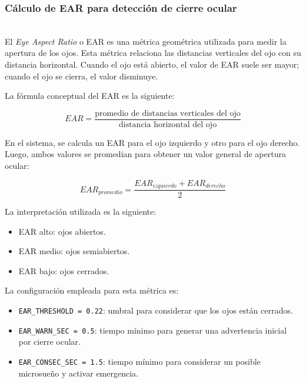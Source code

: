 \documentclass[conference]{IEEEtran}
\begin{document}
\subsubsection{Cálculo de EAR para detección de cierre ocular}\mbox{}\\

El \textit{Eye Aspect Ratio} o EAR es una métrica geométrica utilizada para medir la apertura de los ojos. Esta métrica relaciona las distancias verticales del ojo con su distancia horizontal. Cuando el ojo está abierto, el valor de EAR suele ser mayor; cuando el ojo se cierra, el valor disminuye.

La fórmula conceptual del EAR es la siguiente:

\begin{equation}
EAR = \frac{\text{promedio de distancias verticales del ojo}}{\text{distancia horizontal del ojo}}
\end{equation}

En el sistema, se calcula un EAR para el ojo izquierdo y otro para el ojo derecho. Luego, ambos valores se promedian para obtener un valor general de apertura ocular:

\begin{equation}
EAR_{promedio} = \frac{EAR_{izquierdo} + EAR_{derecho}}{2}
\end{equation}

La interpretación utilizada es la siguiente:

\begin{itemize}
    \item EAR alto: ojos abiertos.
    
    \item EAR medio: ojos semiabiertos.
    
    \item EAR bajo: ojos cerrados.
\end{itemize}

La configuración empleada para esta métrica es:

\begin{itemize}
    \item \texttt{EAR\_THRESHOLD = 0.22}: umbral para considerar que los ojos están cerrados.
    
    \item \texttt{EAR\_WARN\_SEC = 0.5}: tiempo mínimo para generar una advertencia inicial por cierre ocular.
    
    \item \texttt{EAR\_CONSEC\_SEC = 1.5}: tiempo mínimo para considerar un posible microsueño y activar emergencia.
\end{itemize}
\end{document}
